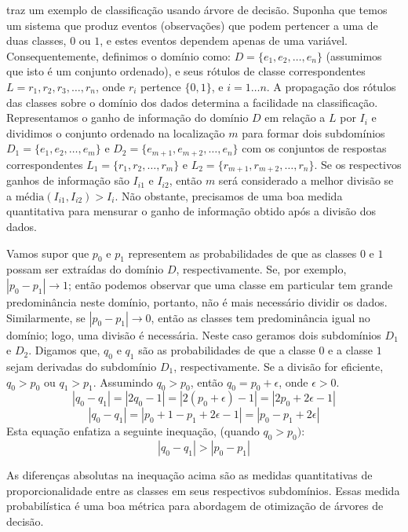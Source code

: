  traz um exemplo de classificação usando
árvore de decisão. Suponha que temos um sistema que produz eventos (observações)
que podem pertencer a uma de duas classes, \(0\) ou \(1\), e estes eventos
dependem apenas de uma variável. Consequentemente, definimos o domínio como: \(D
= \{e_1, e_2, \ldots, e_n\}\) (assumimos que isto é um conjunto ordenado), e
seus rótulos de classe correspondentes \(L = {r_1, r_2, r_3, \ldots, r_n}\),
onde \(r_i\) pertence \(\{0, 1\}\), e \(i = 1 \ldots n\). A propagação dos
rótulos das classes sobre o domínio dos dados determina a facilidade na
classificação. Representamos o ganho de informação do domínio \(D\) em relação a
\(L\) por \(I_i\) e dividimos o conjunto ordenado na localização \(m\) para
formar dois subdomínios \(D_1 = \{e_1, e_2, \ldots, e_m\}\) e \(D_2 = \{e_{m+1},
e_{m+2}, \ldots, e_n\}\) com os conjuntos de respostas correspondentes \(L_1 =
\{r_1, r_2, \ldots, r_m\}\) e \(L_2 = \{r_{m+1}, r_{m+2}, \ldots, r_n\}\). Se os
respectivos ganhos de informação são \(I_{i1}\) e \(I_{i2}\), então \(m\) será
considerado a melhor divisão se a  \(\text{média}(I_{i1}, I_{i2}) > I_i\). Não
obstante, precisamos de uma boa medida quantitativa para mensurar o ganho de
informação obtido após a divisão dos dados.

Vamos supor que \(p_0\) e \(p_1\) representem as probabilidades de que as
classes \(0\) e \(1\) possam ser extraídas do domínio \(D\), respectivamente.
Se, por exemplo, \(|p_0 - p_1| \to 1\); então podemos observar que uma classe em
particular tem grande predominância neste domínio, portanto, não é mais
necessário dividir os dados. Similarmente, se \(|p_0 - p_1| \to 0\), então as
classes tem predominância igual no domínio; logo, uma divisão é necessária.
Neste caso geramos dois subdomínios \(D_1\) e \(D_2\). Digamos que, \(q_0\) e
\(q_1\) são as probabilidades de que a classe \(0\) e a classe \(1\) sejam
derivadas do subdomínio \(D_1\), respectivamente. Se a divisão for eficiente,
\(q_0 > p_0\) ou \(q_1 > p_1\). Assumindo \(q_0 > p_0\), então \(q_0 = p_0 +
\epsilon\), onde \(\epsilon > 0\).
\[|q_0 - q_1| = |2q_0 - 1| = |2(p_0 + \epsilon) - 1| = |2p_0 + 2\epsilon - 1|\]
\[|q_0 - q_1| = |p_0 + 1 - p_1 + 2\epsilon - 1| = |p_0 - p_1 + 2\epsilon|\]
Esta equação enfatiza a seguinte inequação, (quando \(q_0 > p_0)\):
\[|q_0 - q_1| > |p_0 - p_1|\]

As diferenças absolutas na inequação acima são as medidas quantitativas de
proporcionalidade entre as classes em seus respectivos subdomínios. Essas medida
probabilística é uma boa métrica para abordagem de otimização de árvores de
decisão.

